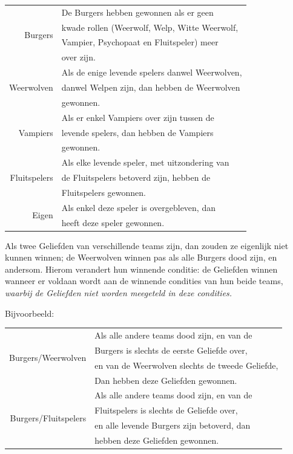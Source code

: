 \documentclass[12pt]{article}
\begin{document}
    \begin{center}
      \begin{tabular}{r|l}
	\multirow{4}{*}{Burgers}
	 & De Burgers hebben gewonnen als er geen \\
	 & kwade rollen (Weerwolf, Welp, Witte Weerwolf, \\
	 & Vampier, Psychopaat en Fluitspeler) meer \\
	 & over zijn. \\
	\hline
	\multirow{3}{*}{Weerwolven}
	 & Als de enige levende spelers danwel Weerwolven, \\
	 & danwel Welpen zijn, dan hebben de Weerwolven \\
	 & gewonnen. \\
	\hline
	\multirow{3}{*}{Vampiers}
	 & Als er enkel Vampiers over zijn tussen de \\
	 & levende spelers, dan hebben de Vampiers \\
	 & gewonnen. \\
	\hline
	\multirow{3}{*}{Fluitspelers}
	 & Als elke levende speler, met uitzondering van \\
	 & de Fluitspelers betoverd zijn, hebben de \\
	 & Fluitspelers gewonnen. \\
	\hline
	\multirow{2}{*}{Eigen} 
	 & Als enkel deze speler is overgebleven, dan \\
	 & heeft deze speler gewonnen. \\
      \end{tabular}
    \end{center}
    
    Als twee Geliefden van verschillende teams zijn, dan zouden ze eigenlijk niet kunnen winnen; de Weerwolven winnen pas als alle Burgers dood zijn, en andersom. Hierom verandert hun winnende conditie: de Geliefden winnen wanneer er voldaan wordt aan de winnende condities van hun beide teams, \emph{waarbij de Geliefden niet worden meegeteld in deze condities.}
    
    Bijvoorbeeld:

    \begin{center}
      \begin{tabular}{r|l}
	\multirow{4}{*}{Burgers/Weerwolven}
	 & Als alle andere teams dood zijn, en van de \\
	 & Burgers is slechts de eerste Geliefde over, \\
	 & en van de Weerwolven slechts de tweede Geliefde, \\
	 & Dan hebben deze Geliefden gewonnen.\\
	\hline
	\multirow{4}{*}{Burgers/Fluitspelers}
	 & Als alle andere teams dood zijn, en van de \\
	 & Fluitspelers is slechts de Geliefde over, \\
	 & en alle levende Burgers zijn betoverd, dan \\
	 & hebben deze Geliefden gewonnen. \\
      \end{tabular}
    \end{center}
    
\end{document}
